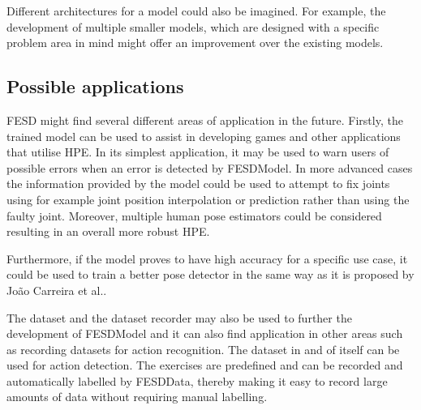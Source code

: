 Different architectures for a model could also be imagined. For example, the development of multiple smaller models, which are designed with a specific problem area in mind might offer an improvement over the existing models.

\subsection{Possible applications}

FESD might find several different areas of application in the future. Firstly, the trained model can be used to assist in developing games and other applications that utilise HPE. In its simplest application, it may be used to warn users of possible errors when an error is detected by FESDModel. In more advanced cases the information provided by the model could be used to attempt to fix joints using for example joint position interpolation or prediction rather than using the faulty joint. Moreover, multiple human pose estimators could be considered resulting in an overall more robust HPE.

Furthermore, if the model proves to have high accuracy for a specific use case, it could be used to train a better pose detector in the same way as it is proposed by Jo\~ao Carreira et al.\cite{IterativeErrorFeedback}.

The dataset and the dataset recorder may also be used to further the development of FESDModel and it can also find application in other areas such as recording datasets for action recognition. The dataset in and of itself can be used for action detection. The exercises are predefined and can be recorded and automatically labelled by FESDData, thereby making it easy to record large amounts of data without requiring manual labelling.